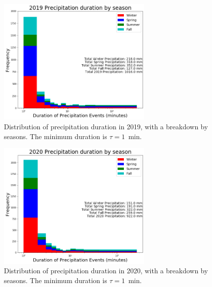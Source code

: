 \documentclass[11pt]{report}
\begin{document}
\clearpage
\begin{figure}[t]
  \centering
  \includegraphics[width=0.675\textwidth]{Figures/precip_2019.png}
  \caption[Precipitation histogram for 2019 broken down by season]
          {\label{p2019}Distribution of precipitation duration in 2019, with
            a breakdown by seasons. The minimum duration is $\tau = 1$~min.
}
\end{figure}

\begin{figure}[b]
	\centering
	\includegraphics[width=0.675\textwidth]{Figures/precip_2020.png}
	\caption[Precipitation histogram for 2020 broken down by
	season]{\label{p2020} Distribution of precipitation duration
		in 2020, with a breakdown by seasons. The minimum duration is $\tau = 1$~min. %
	}
\end{figure}
\end{document}
